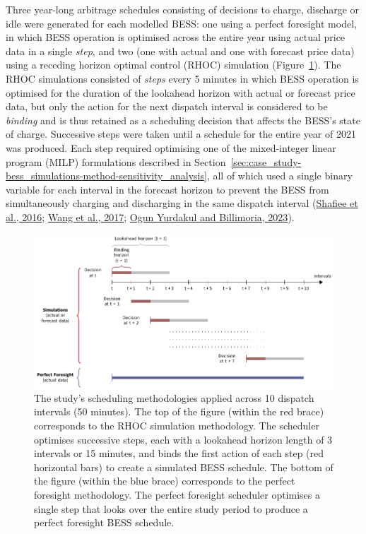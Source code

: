 \documentclass[12pt,a4paper,]{report}
\begin{document}
Three year-long arbitrage schedules consisting of decisions to charge,
discharge or idle were generated for each modelled BESS: one using a
perfect foresight model, in which BESS operation is optimised across the
entire year using actual price data in a single \emph{step}, and two
(one with actual and one with forecast price data) using a receding
horizon optimal control (RHOC) simulation
(Figure~\ref{fig:bess_schedules}). The RHOC simulations consisted of
\emph{steps} every 5 minutes in which BESS operation is optimised for
the duration of the lookahead horizon with actual or forecast price
data, but only the action for the next dispatch interval is considered
to be \emph{binding} and is thus retained as a scheduling decision that
affects the BESS's state of charge. Successive steps were taken until a
schedule for the entire year of 2021 was produced. Each step required
optimising one of the mixed-integer linear program (MILP) formulations
described in
Section~\ref{sec:case_study-bess_simulations-method-sensitivity_analysis},
all of which used a single binary variable for each interval in the
forecast horizon to prevent the BESS from simultaneously charging and
discharging in the same dispatch interval
(\protect\hyperlink{ref-shafieeEconomicAssessmentPricemaker2016}{Shafiee
et al., 2016};
\protect\hyperlink{ref-wangOptimalSchedulingEnergy2017}{Wang et al.,
2017};
\protect\hyperlink{ref-yurdakulRiskAverseSelfSchedulingStorage2023}{Ogun
Yurdakul and Billimoria, 2023}).

\begin{figure}
\hypertarget{fig:bess_schedules}{%
\centering
\includegraphics{source/figures/storage_simulations.pdf}
\caption{The study's scheduling methodologies applied across 10 dispatch
intervals (50 minutes). The top of the figure (within the red brace)
corresponds to the RHOC simulation methodology. The scheduler optimises
successive steps, each with a lookahead horizon length of 3 intervals or
15 minutes, and binds the first action of each step (red horizontal
bars) to create a simulated BESS schedule. The bottom of the figure
(within the blue brace) corresponds to the perfect foresight
methodology. The perfect foresight scheduler optimises a single step
that looks over the entire study period to produce a perfect foresight
BESS schedule.}\label{fig:bess_schedules}
}
\end{figure}
\end{document}
